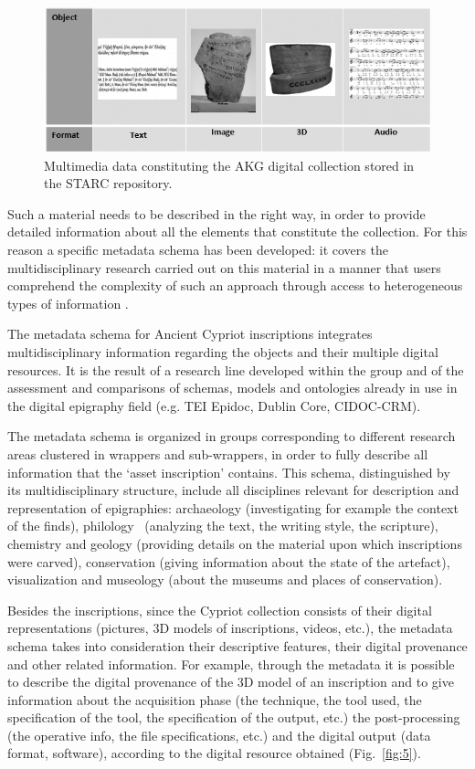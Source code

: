 \documentclass[amsthm,ebook]{saparticle}
\begin{document}
\begin{figure}[!bp]
\centering
 \includegraphics[width=\columnwidth]{DamnjanovicetalEAGLE2016-img004.jpg}
\caption{Multimedia data constituting the AKG digital collection stored in the STARC repository.}
\label{fig:4}
\end{figure}

Such a material needs to be described in the right way, in order to provide detailed information about all the elements
that constitute the collection. For this reason a specific metadata schema has been developed: it covers the
multidisciplinary research carried out on this material in a manner that users comprehend the complexity of such an
approach through access to heterogeneous types of information \citep{vassallo_revealing_2013}.

The metadata schema for Ancient Cypriot inscriptions integrates multidisciplinary information regarding the objects and
their multiple digital resources. It is the result of a research line developed within the group \citep{liuzzo_networking_2014} and of the assessment and comparisons of schemas, models and ontologies already in use in the digital epigraphy
field (e.g. TEI Epidoc, Dublin Core, CIDOC-CRM). 

The metadata schema is organized in groups corresponding to different research areas clustered in wrappers and
sub-wrappers, in order to fully describe all information that the ‘asset inscription’ contains. This schema,
distinguished by its multidisciplinary structure, include all disciplines relevant for description and representation
of epigraphies: archaeology (investigating for example the context of the finds), philology \ (analyzing the text, the
writing style, the scripture), chemistry and geology (providing details on the material upon which inscriptions were
carved), conservation (giving information about the state of the artefact), visualization and museology (about the
museums and places of conservation).

Besides the inscriptions, since the Cypriot collection consists of their digital representations (pictures, 3D models of
inscriptions, videos, etc.), the metadata schema takes into consideration their descriptive features, their digital
provenance and other related information. For example, through the metadata it is possible to describe the digital
provenance of the 3D model of an inscription and to give information about the acquisition phase (the technique, the
tool used, the specification of the tool, the specification of the output, etc.) the post-processing (the operative
info, the file specifications, etc.) and the digital output (data format, software), according to the digital resource
obtained (Fig.~\ref{fig:5}).
\end{document}
